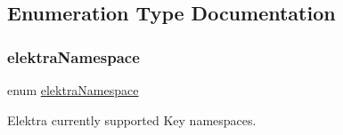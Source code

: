 \subsection{Enumeration Type Documentation}
\mbox{\label{group__key_gaec3b8d6f430ae49b91bafe8a86310a68}} 
\subsubsection{\texorpdfstring{elektra\+Namespace}{elektraNamespace}}
{\footnotesize\ttfamily enum \hyperlink{group__key_gaec3b8d6f430ae49b91bafe8a86310a68}{elektra\+Namespace}}



Elektra currently supported Key namespaces. 

